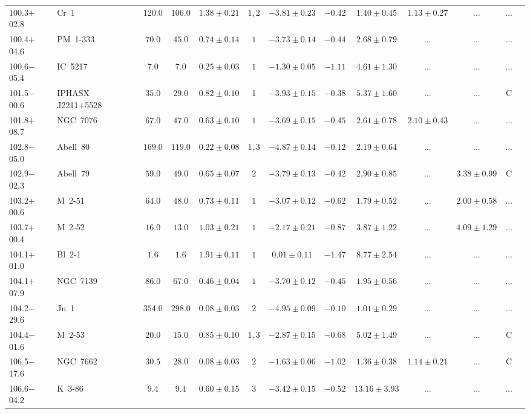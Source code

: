 \documentclass[useAMS]{mn2e}
\begin{document}
\begin{center}
{\begin{longtable}{llccccccccccc}
100.3$+$02.8&Cr~1&$     120.0$&$     106.0$&$1.38 \pm 0.21$&$1,2$&$-3.81 \pm 0.23$&$     -0.42$&$1.40 \pm 0.45$&$1.13 \pm 0.27$&$...$&...\\
100.4$+$04.6&PM~1-333&$      70.0$&$      45.0$&$0.74 \pm 0.14$&$1$&$-3.73 \pm 0.14$&$     -0.44$&$2.68 \pm 0.79$&$...$&$...$&...\\
100.6$-$05.4&IC~5217&$       7.0$&$       7.0$&$0.25 \pm 0.03$&$1$&$-1.30 \pm 0.05$&$     -1.11$&$4.61 \pm 1.30$&$...$&$...$&...\\
101.5$-$00.6	&IPHASX J2211+5528 	&	$35.0$	&	$29.0$	&	$0.82 \pm 0.10$	&	1&	$-3.93 \pm 0.15$	&	$-0.38$	&	$5.37 \pm 1.60$	&	$...$	&	$...$	&	C	\\
101.8$+$08.7&NGC~7076&$      67.0$&$      47.0$&$0.63 \pm 0.10$&$1$&$-3.69 \pm 0.15$&$     -0.45$&$2.61 \pm 0.78$&$2.10 \pm 0.43$&$...$&...\\
102.8$-$05.0&Abell~80&$     169.0$&$     119.0$&$0.22 \pm 0.08$&$1,3$&$-4.87 \pm 0.14$&$     -0.12$&$2.19 \pm 0.64$&$...$&$...$&...\\
102.9$-$02.3&Abell~79&$      59.0$&$      49.0$&$0.65 \pm 0.07$&$2$&$-3.79 \pm 0.13$&$     -0.42$&$2.90 \pm 0.85$&$...$&$3.38 \pm 0.99$&C\\
103.2$+$00.6&M~2-51&$      64.0$&$      48.0$&$0.73 \pm 0.11$&$1$&$-3.07 \pm 0.12$&$     -0.62$&$1.79 \pm 0.52$&$...$&$2.00 \pm 0.58$&...\\
103.7$+$00.4&M~2-52&$      16.0$&$      13.0$&$1.03 \pm 0.21$&$1$&$-2.17 \pm 0.21$&$     -0.87$&$3.87 \pm 1.22$&$...$&$4.09 \pm 1.29$&...\\
104.1$+$01.0&Bl~2-1&$       1.6$&$       1.6$&$1.91 \pm 0.11$&$1$&$0.01 \pm 0.11$&$     -1.47$&$8.77 \pm 2.54$&$...$&$...$&...\\
104.1$+$07.9&NGC~7139&$      86.0$&$      67.0$&$0.46 \pm 0.04$&$1$&$-3.70 \pm 0.12$&$     -0.45$&$1.95 \pm 0.56$&$...$&$...$&...\\
104.2$-$29.6&Jn~1&$     354.0$&$     298.0$&$0.08 \pm 0.03$&$2$&$-4.95 \pm 0.09$&$     -0.10$&$1.01 \pm 0.29$&$...$&$...$&...\\
104.4$-$01.6&M~2-53&$      20.0$&$      15.0$&$0.85 \pm 0.10$&$1,3$&$-2.87 \pm 0.15$&$     -0.68$&$5.02 \pm 1.49$&$...$&$...$&C\\
106.5$-$17.6&NGC~7662&$      30.5$&$      28.0$&$0.08 \pm 0.03$&$2$&$-1.63 \pm 0.06$&$     -1.02$&$1.36 \pm 0.38$&$1.14 \pm 0.21$&$...$&C\\
106.6$-$04.2&K~3-86&$       9.4$&$       9.4$&$0.60 \pm 0.15$&$3$&$-3.42 \pm 0.15$&$     -0.52$&$13.16 \pm 3.93$&$...$&$...$&...\\

\end{longtable}}
\end{center}
\end{document}
